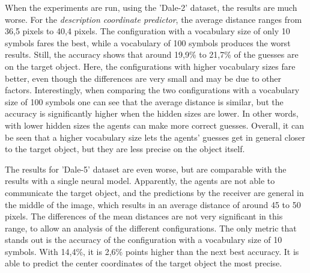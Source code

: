 When the experiments are run, using the 'Dale-2' dataset, the results are much worse.
For the \emph{description coordinate predictor}, the average distance ranges from 36,5 pixels to 40,4 pixels.
The configuration with a vocabulary size of only 10 symbols fares the best, while a vocabulary of 100 symbols produces the worst results.
Still, the accuracy shows that around 19,9\% to 21,7\% of the guesses are on the target object.
Here, the configurations with higher vocabulary sizes fare better, even though the differences are very small and may be due to other factors.
Interestingly, when comparing the two configurations with a vocabulary size of 100 symbols one can see that the average distance is similar, but the accuracy is significantly higher when the hidden sizes are lower.
In other words, with lower hidden sizes the agents can make more correct guesses.
Overall, it can be seen that a higher vocabulary size lets the agents' guesses get in general closer to the target object, but they are less precise on the object itself.

The results for 'Dale-5' dataset are even worse, but are comparable with the results with a single neural model.
Apparently, the agents are not able to communicate the target object, and the predictions by the receiver are general in the middle of the image, which results in an average distance of around 45 to 50 pixels.
The differences of the mean distances are not very significant in this range, to allow an analysis of the different configurations.
The only metric that stands out is the accuracy of the configuration with a vocabulary size of 10 symbols.
With 14,4\%, it is 2,6\% points higher than the next best accuracy.
It is able to predict the center coordinates of the target object the most precise.

